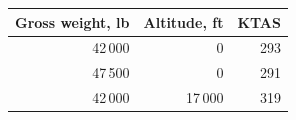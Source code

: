 \begin{tabular}{@{}rrr@{}}
\toprule
Gross weight, lb & Altitude, ft & KTAS \\
\midrule
42\,000 & 0 & 293 \\
47\,500 & 0 & 291 \\
42\,000 & 17\,000 & 319 \\
\bottomrule
\end{tabular}

